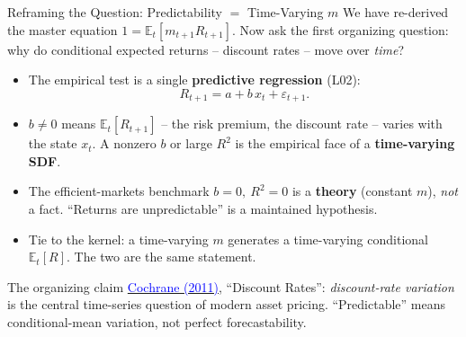 \documentclass{beamer}
\newcommand{\E}{\mathbb{E}}
\begin{document}
\begin{frame}{Reframing the Question: Predictability $=$ Time-Varying $m$}
We have re-derived the master equation $1 = \E_t[m_{t+1}R_{t+1}]$. Now ask the \alert{first organizing question}: why do conditional expected returns -- discount rates -- move over \textit{time}?

\begin{itemize}
  \item The empirical test is a single \textbf{predictive regression} (L02):
  \begin{equation*}
    R_{t+1} = a + b\,x_t + \varepsilon_{t+1}.
  \end{equation*}
  \item $b \neq 0$ means $\E_t[R_{t+1}]$ -- the risk premium, the discount rate -- \alert{varies with the state} $x_t$. A nonzero $b$ or large $R^2$ is the empirical face of a \textbf{time-varying SDF}.
  \item The efficient-markets benchmark $b=0,\ R^2=0$ is a \textbf{theory} (constant $m$), \textit{not} a fact. ``Returns are unpredictable'' is a maintained hypothesis.
  \item Tie to the kernel: a time-varying $m$ generates a time-varying conditional $\E_t[R]$. The two are the same statement.
\end{itemize}

\begin{block}{The organizing claim}
\href{https://doi.org/10.1111/j.1540-6261.2011.01671.x}{\textcolor{blue}{Cochrane (2011)}}, ``Discount Rates'': \textit{discount-rate variation} is the central time-series question of modern asset pricing. ``Predictable'' means conditional-mean variation, not perfect forecastability.
\end{block}
\end{frame}
\end{document}
